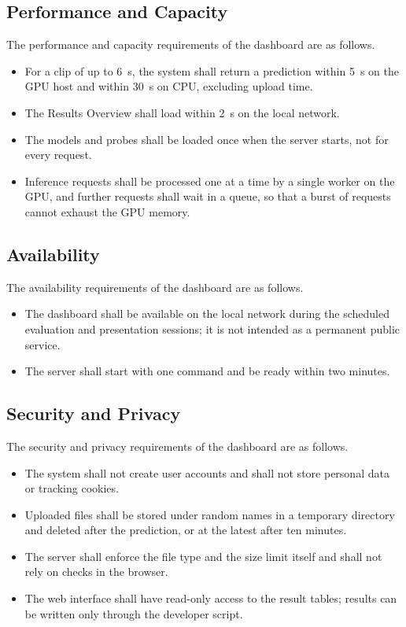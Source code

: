 \documentclass{FastFyp}
\begin{document}
\subsection{Performance and Capacity}
The performance and capacity requirements of the dashboard are as follows.
\begin{itemize}
  \item For a clip of up to 6~s, the system shall return a prediction within 5~s on the GPU host and within 30~s on CPU, excluding upload time.
  \item The Results Overview shall load within 2~s on the local network.
  \item The models and probes shall be loaded once when the server starts, not for every request.
  \item Inference requests shall be processed one at a time by a single worker on the GPU, and further requests shall wait in a queue, so that a burst of requests cannot exhaust the GPU memory.
\end{itemize}

\subsection{Availability}
The availability requirements of the dashboard are as follows.
\begin{itemize}
  \item The dashboard shall be available on the local network during the scheduled evaluation and presentation sessions; it is not intended as a permanent public service.
  \item The server shall start with one command and be ready within two minutes.
\end{itemize}

\subsection{Security and Privacy}
The security and privacy requirements of the dashboard are as follows.
\begin{itemize}
  \item The system shall not create user accounts and shall not store personal data or tracking cookies.
  \item Uploaded files shall be stored under random names in a temporary directory and deleted after the prediction, or at the latest after ten minutes.
  \item The server shall enforce the file type and the size limit itself and shall not rely on checks in the browser.
  \item The web interface shall have read-only access to the result tables; results can be written only through the developer script.
\end{itemize}
\end{document}
